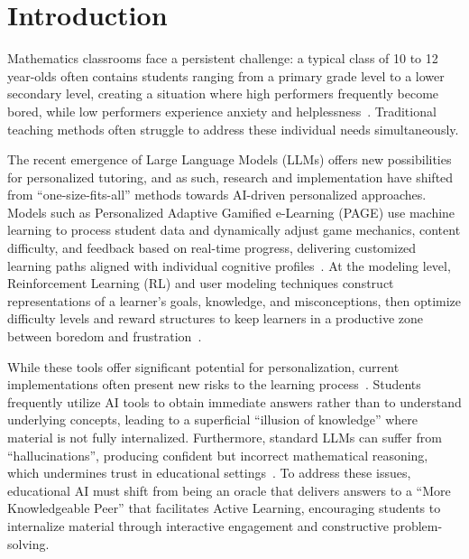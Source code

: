 \section{Introduction}


Mathematics classrooms face a persistent challenge: a typical class of 10 to 12 year-olds often contains students ranging from a primary grade level to a lower secondary level, creating a situation where high performers frequently become bored, while low performers experience anxiety and helplessness~\cite{tabassum2024managing}. Traditional teaching methods often struggle to address these individual needs simultaneously.

The recent emergence of Large Language Models (LLMs) offers new possibilities for personalized tutoring, and as such, research and implementation have shifted from \enquote{one-size-fits-all} methods towards AI-driven personalized approaches. Models such as Personalized Adaptive Gamified e-Learning (PAGE) use machine learning to process student data and dynamically adjust game mechanics, content difficulty, and feedback based on real-time progress, delivering customized learning paths aligned with individual cognitive profiles~\cite{maher2020learners}. At the modeling level, Reinforcement Learning (RL) and user modeling techniques construct representations of a learner's goals, knowledge, and misconceptions, then optimize difficulty levels and reward structures to keep learners in a productive zone between boredom and frustration~\cite{kobsa1990user}.

While these tools offer significant potential for personalization, current implementations often present new risks to the learning process~\cite{pt2025beyond}. Students frequently utilize AI tools to obtain immediate answers rather than to understand underlying concepts, leading to a superficial \enquote{illusion of knowledge} where material is not fully internalized. Furthermore, standard LLMs can suffer from \enquote{hallucinations}, producing confident but incorrect mathematical reasoning, which undermines trust in educational settings~\cite{steyvers2025what}. To address these issues, educational AI must shift from being an oracle that delivers answers to a \enquote{More Knowledgeable Peer} that facilitates Active Learning, encouraging students to internalize material through interactive engagement and constructive problem-solving.

